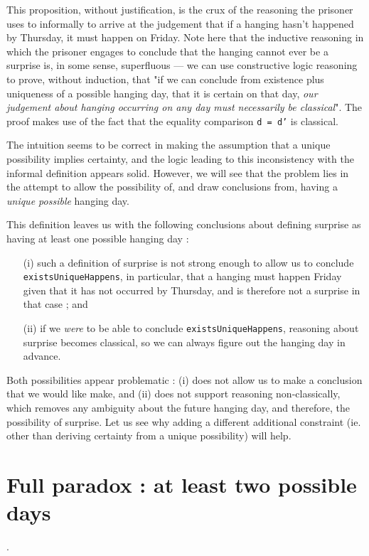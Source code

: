 \documentclass[journal]{journal}
\begin{document}
This proposition, without justification, is the crux of the reasoning the prisoner
uses to informally to arrive at the judgement that
if a hanging hasn't happened by Thursday, it must happen on Friday.
Note here that the inductive reasoning in which the prisoner engages to conclude that the
hanging cannot ever be a surprise is, in some sense, superfluous --- we can use
constructive logic reasoning to prove, without induction, that "if we can conclude
from existence plus uniqueness of a possible hanging day, that it is certain on that day,
\emph{our judgement about hanging occurring on any day must necessarily be classical}".
The proof makes use of the fact that the equality comparison {\tt d = d'} is
classical.

The intuition seems to be correct in making the assumption that a unique possibility
implies certainty, and the logic leading to this inconsistency with the informal
definition appears solid.
However, we will see that the problem lies in the attempt
to allow the possibility of, and draw conclusions from, having a \emph{unique possible }
hanging day.

This definition leaves us with the following conclusions about defining surprise as
having at least one possible hanging day :

\begin{itemize}
  \item[(i)] such a definition of surprise is not strong enough to allow us to conclude
  {\tt existsUniqueHappens}, in particular, that a hanging
  must happen Friday given that it has not occurred by Thursday, and is
  therefore not a surprise in that case ; and \newline
  \item[(ii)] if we \emph{were} to be able to conclude {\tt existsUniqueHappens},
  reasoning about surprise
  becomes classical, so we can always figure out the hanging day in advance.
\end{itemize}

Both possibilities appear problematic : (i) does not allow us to make
a conclusion that we would like make,
and (ii) does not support reasoning non-classically, which removes any ambiguity
about the future hanging day, and therefore, the possibility of surprise.
Let us see why adding a different additional constraint (ie. other than deriving
certainty from a unique possibility) will help.

\section{Full paradox : at least two possible days}.
\label{sec:two}
\end{document}
